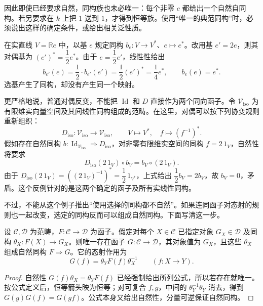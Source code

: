 因此即使已经要求自然，同构族也未必唯一：每个非零 \(c\) 都给出一个自然自同构。若另要求在 \(k\) 上把 \(1\) 送到 \(1\)，才得到恒等族。使用“唯一的典范同构”时，必须说出这样的确定条件，或给出相关泛性质。

\begin{example}\label{b4:ex:basis-dual-not-natural}
	在实直线 \(V=\mathbb R e\) 中，以基 \(e\) 规定同构 \(b_e:V\rightarrow V^*\)、\(e\mapsto e^*\)。改用基 \(e'=2e\)，则其对偶基为 \((e')^*=\dfrac12e^*\)。由于 \(e=\dfrac12e'\)，线性性给出
	\[
		b_{e'}(e)=\dfrac12\cdot b_{e'}(e') =\dfrac12(e')^*=\dfrac14e^*,\qquad b_e(e)=e^*.
	\]
	选基产生了同构，却没有产生同一个映射。

	\ProseParagraphBreak
	更严格地说，普通对偶反变，不能把 \(\operatorname{Id}\) 和 \(D\) 直接作为两个同向函子。令 \(\mathcal V_{\mathrm{iso}}\) 为有限维实向量空间及其间线性同构组成的范畴。在这里，对偶可以按下列协变规则重新组织：
	\[
		D_{\mathrm{iso}}:\mathcal V_{\mathrm{iso}}\longrightarrow\mathcal V_{\mathrm{iso}}, \qquad V\longmapsto V^*,\quad f\longmapsto(f^{-1})^*.
	\]
	假如存在自然同构 \(b:\operatorname{Id}_{\mathcal V_{\mathrm{iso}}}\Rightarrow D_{\mathrm{iso}}\)，对非零有限维实空间的同构 \(f=2\,1_V\)，自然性将要求
	\[
		D_{\mathrm{iso}}(2\,1_V)\circ b_V=b_V\circ(2\,1_V).
	\]
	由于 \(D_{\mathrm{iso}}(2\,1_V)=((2\,1_V)^{-1})^*=\dfrac12\,1_{V^*}\)，上式给出 \(\dfrac12b_V=2b_V\)，故 \(b_V=0\)，矛盾。这个反例针对的是这两个确定的函子及所有实线性同构。
\end{example}

不过，不能从这个例子推出“使用选择的同构都不自然”。如果连同函子对态射的规则也一起改变，选定的同构反而可以组成自然同构。下面写清这一步。

\begin{proposition}\label{b4:prop:transported-functor}
	设 \(\mathcal C,\mathcal D\) 为范畴，\(F:\mathcal C\rightarrow\mathcal D\) 为函子。假定对每个 \(X\in\mathcal C\) 已指定对象 \(G_X\in\mathcal D\) 及同构 \(\theta_X:F(X)\rightarrow G_X\)。则唯一存在函子 \(G:\mathcal C\rightarrow\mathcal D\)，其对象值为 \(G_X\)，且这些 \(\theta_X\) 组成自然同构 \(F\Rightarrow G\)。它的态射作用为
	\[
		G(f)=\theta_YF(f)\theta_X^{-1} \qquad(f:X\rightarrow Y).
	\]
\end{proposition}
\begin{proof}
	自然性 \(G(f)\theta_X=\theta_YF(f)\) 已经强制给出所列公式，所以若存在就唯一。按公式定义后，恒等箭头映为恒等；对可复合 \(f,g\)，中间的 \(\theta_Y^{-1}\theta_Y\) 消去，得到 \(G(g)G(f)=G(gf)\)。公式本身又给出自然性，分量可逆保证自然同构。
\end{proof}


